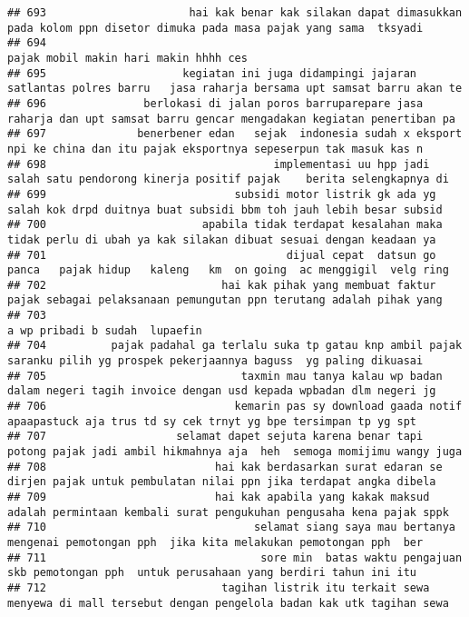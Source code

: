 \documentclass[
]{article}
\begin{document}
\begin{verbatim}
## 693                      hai kak benar kak silakan dapat dimasukkan pada kolom ppn disetor dimuka pada masa pajak yang sama  tksyadi
## 694                                                                                            pajak mobil makin hari makin hhhh ces
## 695                     kegiatan ini juga didampingi jajaran satlantas polres barru   jasa raharja bersama upt samsat barru akan te 
## 696               berlokasi di jalan poros barruparepare jasa raharja dan upt samsat barru gencar mengadakan kegiatan penertiban pa 
## 697              benerbener edan   sejak  indonesia sudah x eksport npi ke china dan itu pajak eksportnya sepeserpun tak masuk kas n
## 698                                   implementasi uu hpp jadi salah satu pendorong kinerja positif pajak    berita selengkapnya di 
## 699                             subsidi motor listrik gk ada yg salah kok drpd duitnya buat subsidi bbm toh jauh lebih besar subsid 
## 700                        apabila tidak terdapat kesalahan maka tidak perlu di ubah ya kak silakan dibuat sesuai dengan keadaan ya 
## 701                                     dijual cepat  datsun go panca   pajak hidup   kaleng   km  on going  ac menggigil  velg ring
## 702                           hai kak pihak yang membuat faktur pajak sebagai pelaksanaan pemungutan ppn terutang adalah pihak yang 
## 703                                                                                                   a wp pribadi b sudah  lupaefin
## 704          pajak padahal ga terlalu suka tp gatau knp ambil pajak saranku pilih yg prospek pekerjaannya baguss  yg paling dikuasai
## 705                              taxmin mau tanya kalau wp badan dalam negeri tagih invoice dengan usd kepada wpbadan dlm negeri jg 
## 706                             kemarin pas sy download gaada notif apaapastuck aja trus td sy cek trnyt yg bpe tersimpan tp yg spt 
## 707                    selamat dapet sejuta karena benar tapi potong pajak jadi ambil hikmahnya aja  heh  semoga momijimu wangy juga
## 708                          hai kak berdasarkan surat edaran se dirjen pajak untuk pembulatan nilai ppn jika terdapat angka dibela 
## 709                          hai kak apabila yang kakak maksud adalah permintaan kembali surat pengukuhan pengusaha kena pajak sppk 
## 710                                selamat siang saya mau bertanya mengenai pemotongan pph  jika kita melakukan pemotongan pph  ber 
## 711                                 sore min  batas waktu pengajuan skb pemotongan pph  untuk perusahaan yang berdiri tahun ini itu 
## 712                           tagihan listrik itu terkait sewa menyewa di mall tersebut dengan pengelola badan kak utk tagihan sewa 

\end{verbatim}
\end{document}
